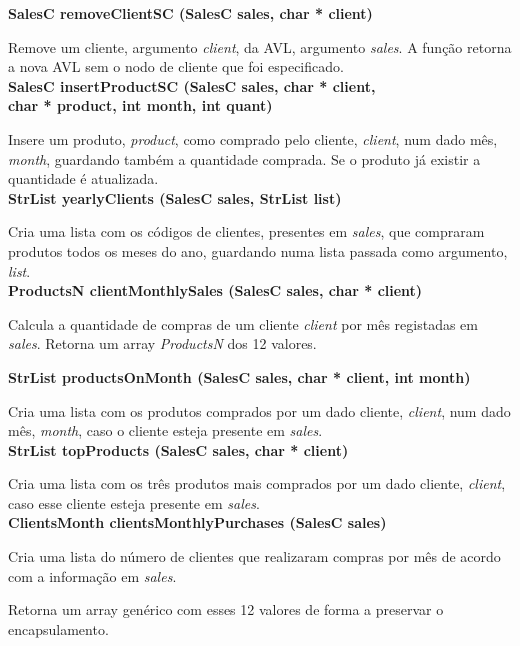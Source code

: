 \documentclass[10pt] {article}
\begin{document}
\noindent \textbf {SalesC removeClientSC (SalesC sales, char * client)}
\par Remove um cliente, argumento \emph{client}, da AVL, argumento \emph{sales}. A função retorna a nova AVL 
sem o nodo de cliente que foi especificado. \\

\noindent \textbf {SalesC insertProductSC (SalesC sales, char * client, \\ char * product, int month, int quant)}
\par Insere um produto, \emph{product}, como comprado pelo cliente, \emph{client}, num dado mês, \emph{month}, 
guardando também a quantidade comprada. Se o produto já existir a quantidade é atualizada. \\

\noindent \textbf {StrList yearlyClients (SalesC sales, StrList list)}
\par Cria uma lista com os códigos de clientes, presentes em \emph{sales}, que compraram produtos todos os 
meses do ano, guardando numa lista passada como argumento, \emph{list}. \\

\noindent \textbf {ProductsN clientMonthlySales (SalesC sales, char * client)}
\par Calcula a quantidade de compras de um cliente \emph{client} por mês registadas em \emph{sales}. Retorna um array \emph{ProductsN} dos 12 valores.  

\noindent \textbf {StrList productsOnMonth (SalesC sales, char * client, int month)}
\par Cria uma lista com os produtos comprados por um dado cliente, \emph{client}, num dado mês, \emph{month}, 
caso o cliente esteja presente em \emph{sales}. \\

\noindent \textbf {StrList topProducts (SalesC sales, char * client)}
\par Cria uma lista com os três produtos mais comprados por um dado cliente, \emph{client}, caso esse cliente 
esteja presente em \emph{sales}. \\

\noindent \textbf {ClientsMonth clientsMonthlyPurchases (SalesC sales)}
\par Cria uma lista do número de clientes que realizaram compras por mês de acordo com a informação em \emph{sales}.
\par Retorna um array genérico com esses 12 valores de forma a preservar o encapsulamento.
\end{document}
